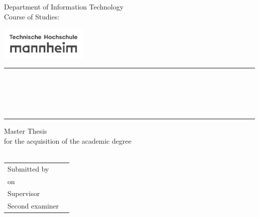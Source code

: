 \begin{titlepage}
  \parbox[b]{80mm}{
    Department of Information Technology\\
    Course of Studies: \studiengang}
  \hfill
  \parbox[b]{42mm}{\includegraphics[width=42mm,valign=c,raise=3mm]{images/thmannheimlogo_grey.pdf}}
  \begin{center}
    \rule{1\textwidth}{1pt}\\[-3mm]
    \parbox[t][64mm]{110mm}{%
      \begin{center}
        \vspace{6mm}
        {\begin{spacing}{1.13} \huge \bfseries \titel \end{spacing}}
        \vfill
        \Large{\autor} \\[1mm] %
        \ 
      \end{center}
    }
    \rule{\textwidth}{1pt}    
    \vfill    
    {\Large Master Thesis} \\[5mm]
    {\large for the acquisition of the academic degree} \\[5mm]
    {\large \welchethesis\ \thesisofwas} \\[5mm]
    \vfill    
    \begin{tabular}{ll}
    Submitted by & \autor \\
    on & \datum \\
    Supervisor & \hochschullehrer \\
    Second examiner & \zweikorrektor
    \end{tabular}   
    \vfill
  \end{center}
\end{titlepage}
\cleardoublepage


